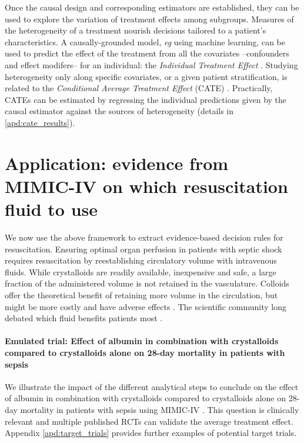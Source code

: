 \documentclass[french,12pt,twoside,a4paper]{book}
\begin{document}
Once the causal design and corresponding estimators are established, they can be
used to explore the variation of treatment effects among subgroups. Measures of
the heterogeneity of a treatment nourish decisions tailored to a patient's
characteristics. A causally-grounded model, \emph{eg} using machine learning,
can be used to predict the effect of the treatment from all the covariates
--confounders and effect modifers-- for an individual: the \emph{Individual
  Treatment Effect} \citep[ITE][]{lu2018estimating}. Studying heterogeneity only
along specific covariates, or a given patient stratification, is related to the
\emph{Conditional Average Treatment Effect} (CATE)
\citep{robertson2021assessing}. Practically, CATEs can be estimated by
regressing the individual predictions given by the causal estimator against the
sources of heterogeneity (details in \ref{apd:cate_results}).


\section{Application: evidence from MIMIC-IV on which resuscitation fluid to
  use}%
\label{sec:causal_tuto:application}%

We now use the above framework to extract evidence-based decision
rules for resuscitation.
Ensuring optimal organ perfusion in patients with septic shock requires
resuscitation by reestablishing circulatory volume with intravenous fluids.
While crystalloids are readily available, inexpensive and safe, a large fraction
of the administered volume is not retained in the vasculature. Colloids
offer the theoretical benefit of retaining more volume in the circulation, but
might be more costly and have adverse effects \citep{annane2013effects}. The
scientific community long debated which fluid benefits patients most
\citep{mandel2023treatment}.

\paragraph{Emulated trial: Effect of albumin in combination with crystalloids
  compared to crystalloids alone on 28-day mortality in patients with sepsis}\label{emulated_trial}

We illustrate the impact of the different analytical steps to conclude
on the effect of albumin in combination with crystalloids compared to
crystalloids alone on 28-day mortality in patients with sepsis using MIMIC-IV
\citep{johnson2020mimic}. This question is clinically relevant and
multiple published RCTs
can validate the average treatment effect.
Appendix \ref{apd:target_trials} provides further examples of
potential target trials.
\end{document}
